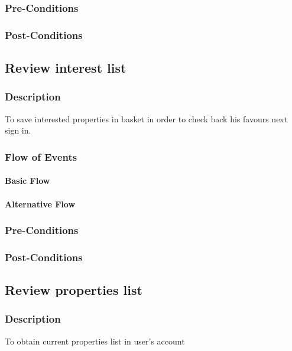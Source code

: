 \documentclass[a4paper,12pt]{article}
\begin{document}
\subsubsection{Pre-Conditions}
\subsubsection{Post-Conditions}

\subsection{Review interest list}
\subsubsection{Description}
To save interested properties in basket in order to check back his favours next sign in.
\subsubsection{Flow of Events}
\paragraph{Basic Flow}
\begin{itemize}
\end{itemize}

\paragraph{Alternative Flow}
\begin{itemize}
\end{itemize}

\subsubsection{Pre-Conditions}
\subsubsection{Post-Conditions}

\subsection{Review properties list}
\subsubsection{Description}
To obtain current properties list in user's account
\end{document}
